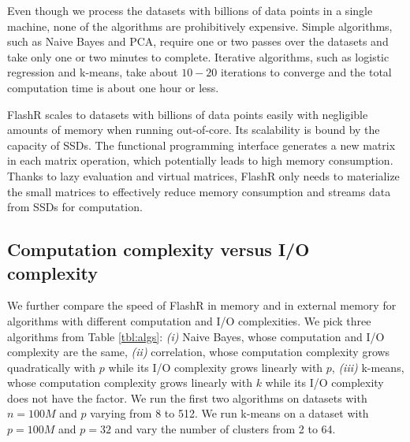 Even though we process the datasets with billions of data points in a single
machine, none of the algorithms are prohibitively expensive. Simple algorithms,
such as Naive Bayes and PCA, require one or two passes over the datasets and
take only one or two minutes to complete. Iterative
algorithms, such as logistic regression and k-means, take about $10-20$
iterations to converge and the total computation time is about one hour or
less.

FlashR scales to datasets with billions of data points easily with negligible
amounts of memory when running out-of-core.
Its scalability is bound by the capacity of SSDs. The functional programming
interface generates a new matrix in each matrix operation, which potentially
leads to high memory consumption. Thanks to lazy evaluation and virtual matrices,
FlashR only needs to materialize the small matrices to effectively reduce
memory consumption and streams data from SSDs for computation.

\subsection{Computation complexity versus I/O complexity}
We further compare the speed of FlashR in memory and in external memory
for algorithms with different computation and I/O complexities.
We pick three algorithms from Table \ref{tbl:algs}: \textit{(i)} Naive Bayes,
whose computation and I/O complexity are the same, \textit{(ii)}
correlation, whose computation complexity grows quadratically with $p$ while
its I/O complexity grows linearly with $p$, \textit{(iii)} k-means, whose computation
complexity grows linearly with $k$ while its I/O complexity does not have
the factor. We run the first two algorithms on datasets with $n=100M$ and $p$
varying from 8 to 512. We run k-means on a dataset with $p=100M$ and $p=32$
and vary the number of clusters from 2 to 64.

